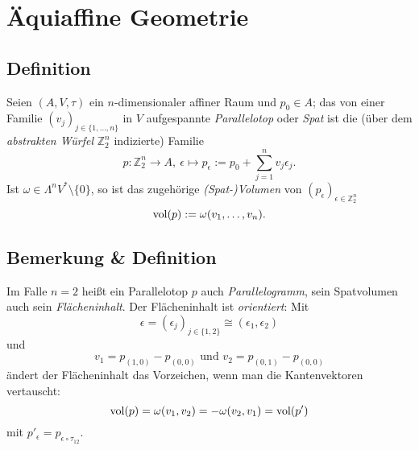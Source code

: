 \section{Äquiaffine Geometrie}
\subsection{Definition}
	\begin{Definition}
		Seien $ (A,V,\tau) $ ein $ n $-dimensionaler affiner Raum und $ p_0\in A $; das von einer Familie $ (v_j)_{j\in \{1,\dots,n\}} $ in $ V $ aufgespannte \emph{Parallelotop} oder \emph{Spat} ist die (über dem \emph{abstrakten Würfel} $ \mathbb{Z}_2^n $ indizierte) Familie
			\[ p: \mathbb{Z}_2^n\to A,\ \epsilon \mapsto p_\epsilon := p_0 +\sum_{j=1}^{n}v_j\epsilon_j. \]
		Ist $ \omega\in\Lambda^nV^*\setminus\{0\} $, so ist das zugehörige \emph{(Spat-)Volumen} von $ (p_\epsilon)_{\epsilon \in \mathbb{Z}_2^n} $
			\[ \operatorname{vol}(p):= \omega(v_1,\dots,v_n). \]
	\end{Definition}
\begin{figure}[H]
	\centering
{}
\end{figure}
\subsection{Bemerkung \& Definition}
	\begin{Definition}
		Im Falle $ n=2 $ heißt ein Parallelotop $ p $ auch \emph{Parallelogramm}, sein Spatvolumen auch sein \emph{Flächeninhalt}. Der Flächeninhalt ist \emph{orientiert}:
		Mit
			\[ \epsilon = (\epsilon_j)_{j\in \{1,2\}}\cong (\epsilon_1,\epsilon_2) \]
		und
			\[ v_1 = p_{(1,0)}-p_{(0,0)}\text{ und } v_2 = p_{(0,1)}-p_{(0,0)} \]
		ändert der Flächeninhalt das Vorzeichen, wenn man die Kantenvektoren vertauscht:
			\[ \operatorname{vol}(p) = \omega(v_1,v_2) = -\omega(v_2,v_1) = \operatorname{vol}(p') \]
		mit $ p'_\epsilon = p_{\epsilon \circ \tau_{12}} $.
	\end{Definition}

